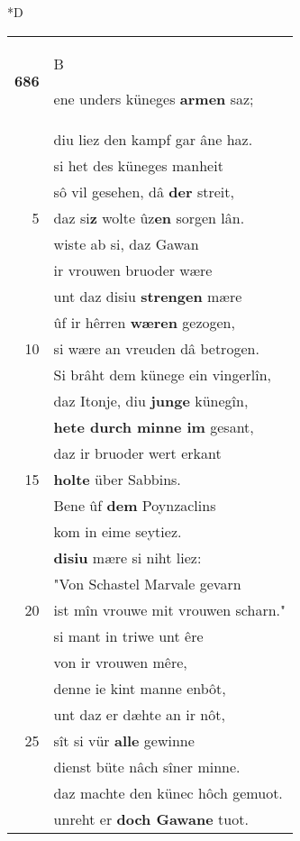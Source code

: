 \documentclass[8pt,a4paper,notitlepage]{article}
\begin{document}
\begin{table}[ht]
\begin{minipage}[t]{0.5\linewidth}
\small
\begin{center}*D
\end{center}
\begin{tabular}{rl}
\textbf{686} & \begin{large}B\end{large}ene unders küneges \textbf{armen} saz;\\ 
 & diu liez den kampf gar âne haz.\\ 
 & si het des küneges manheit\\ 
 & sô vil gesehen, dâ \textbf{der} streit,\\ 
5 & daz si\textbf{z} wolte ûz\textbf{en} sorgen lân.\\ 
 & wiste ab si, daz Gawan\\ 
 & ir vrouwen bruoder wære\\ 
 & unt daz disiu \textbf{strengen} mære\\ 
 & ûf ir hêrren \textbf{wæren} gezogen,\\ 
10 & si wære an vreuden dâ betrogen.\\ 
 & Si brâht dem künege ein vingerlîn,\\ 
 & daz Itonje, diu \textbf{junge} künegîn,\\ 
 & \textbf{hete durch minne im} gesant,\\ 
 & daz ir bruoder wert erkant\\ 
15 & \textbf{holte} über Sabbins.\\ 
 & Bene ûf \textbf{dem} Poynzaclins\\ 
 & kom in eime seytiez.\\ 
 & \textbf{disiu} mære si niht liez:\\ 
 & "Von Schastel Marvale gevarn\\ 
20 & ist mîn vrouwe mit vrouwen scharn."\\ 
 & si mant in triwe unt êre\\ 
 & von ir vrouwen mêre,\\ 
 & denne ie kint manne enbôt,\\ 
 & unt daz er dæhte an ir nôt,\\ 
25 & sît si vür \textbf{alle} gewinne\\ 
 & dienst büte nâch sîner minne.\\ 
 & daz machte den künec hôch gemuot.\\ 
 & unreht er \textbf{doch Gawane} tuot.\\ 

\end{tabular}
\end{minipage}
\end{table}
\end{document}
